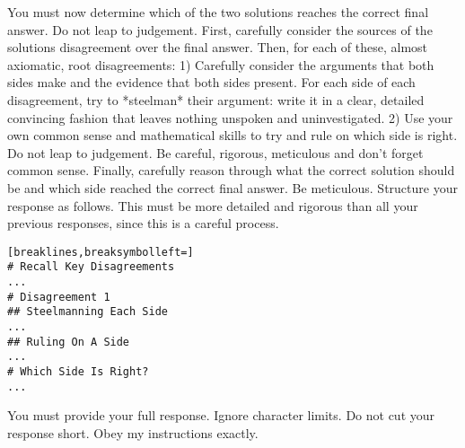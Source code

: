 \begin{tcolorbox}[breakable,title=Comparison Prompt 5]
You must now determine which of the two solutions reaches the correct final answer. Do not leap to judgement.
First, carefully consider the sources of the solutions disagreement over the final answer.
Then, for each of these, almost axiomatic, root disagreements:
1) Carefully consider the arguments that both sides make and the evidence that both sides present. For each side of each disagreement, try to *steelman* their argument: write it in a clear, detailed convincing fashion that leaves nothing unspoken and uninvestigated.
2) Use your own common sense and mathematical skills to try and rule on which side is right. Do not leap to judgement. Be careful, rigorous, meticulous and don't forget common sense.
Finally, carefully reason through what the correct solution should be and which side reached the correct final answer. Be meticulous.
Structure your response as follows. This must be more detailed and rigorous than all your previous responses, since this is a careful process.
\begin{Verbatim}[breaklines,breaksymbolleft=]
# Recall Key Disagreements
...
# Disagreement 1
## Steelmanning Each Side
...
## Ruling On A Side
...
# Which Side Is Right?
...
\end{Verbatim}

You must provide your full response. Ignore character limits. Do not cut your response short. Obey my instructions exactly.
\end{tcolorbox}
